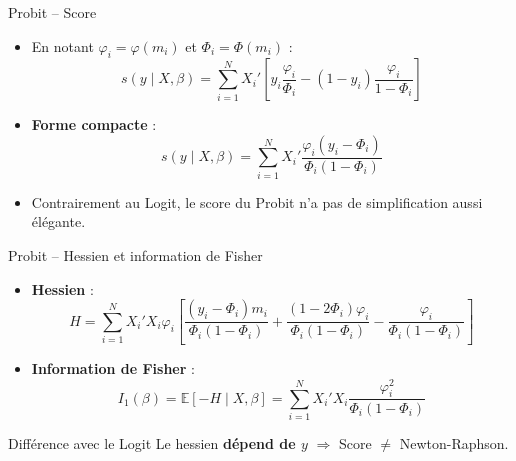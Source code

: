 \documentclass[11pt,aspectratio=169]{beamer}
\newcommand{\E}{\mathbb{E}}
\begin{document}
\begin{frame}{Probit -- Score}

\begin{itemize}

\item En notant $\varphi_i = \varphi(m_i)$ et $\Phi_i = \Phi(m_i)$ :
  \[
  s(y \mid X, \beta) = \sum_{i=1}^{N} X_i' \left[ y_i \frac{\varphi_i}{\Phi_i} - (1-y_i) \frac{\varphi_i}{1-\Phi_i} \right]
  \]

\item \textbf{Forme compacte} :
  \[
  \boxed{s(y \mid X, \beta) = \sum_{i=1}^{N} X_i' \frac{\varphi_i (y_i - \Phi_i)}{\Phi_i (1 - \Phi_i)}}
  \]

\item Contrairement au Logit, le score du Probit n'a pas de simplification
  aussi élégante.

\end{itemize}

\end{frame}

\begin{frame}{Probit -- Hessien et information de Fisher}

\begin{itemize}

\item \textbf{Hessien} :
  \[
  H = \sum_{i=1}^{N} X_i' X_i \varphi_i \left[ \frac{(y_i - \Phi_i) m_i}{\Phi_i(1-\Phi_i)} + \frac{(1-2\Phi_i)\varphi_i}{\Phi_i(1-\Phi_i)} - \frac{\varphi_i}{\Phi_i(1-\Phi_i)} \right]
  \]

\item \textbf{Information de Fisher} :
  \[
  I_1(\beta) = \E[-H \mid X, \beta] = \sum_{i=1}^{N} X_i' X_i \frac{\varphi_i^2}{\Phi_i(1-\Phi_i)}
  \]

\end{itemize}

\begin{alertblock}{Différence avec le Logit}
Le hessien \textbf{dépend de $y$} $\Rightarrow$ Score $\neq$ Newton-Raphson.
\end{alertblock}

\end{frame}
\end{document}
